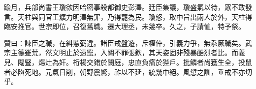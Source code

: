 \begin{pinyinscope}
踰月，兵部尚書王瓊欲因哈密事殺都御史彭澤。廷臣集議，瓊盛氣以待，眾不敢發言。天柱與同官王爌力明澤無罪，乃得罷為民。瓊怒，取中旨出兩人於外，天柱得臨安推官。世宗即位，召復舊職。遷大理丞，未幾卒。久之，子請恤，特予祭。

贊曰：諫臣之職，在糾慝弼違。諸臣戒盤遊，斥權倖，引義力爭，無忝厥職矣。武宗主德雖荒，然文明止於遠竄，入關不罪張欽，其天姿固非殘暴酷烈者比。而義兒、閹豎，煬灶為奸。桁楊交錯於闕庭，忠直負痛於狴戶。批鱗者尚獲生全，投鼠者必陷死地。元氣日削，朝野震驚，祚以不延，統幾中絕。風愆之訓，垂戒不亦切乎。


\end{pinyinscope}
